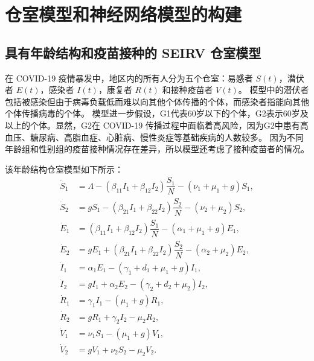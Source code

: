\chapter{仓室模型和神经网络模型的构建} \label{ch:models}


\section{具有年龄结构和疫苗接种的 SEIRV 仓室模型}

在 COVID-19 疫情暴发中，地区内的所有人分为五个仓室：易感者 $ S(t) $，潜伏者 $ E(t) $，感染者 $ I(t) $，康复者 $ R(t) $ 和接种疫苗者 $ V(t) $。
模型中的潜伏者包括被感染但由于病毒负载低而难以向其他个体传播的个体，而感染者指能向其他个体传播病毒的个体。
模型进一步假设，G1代表60岁以下的个体，G2表示60岁及以上的个体。显然，G2在 COVID-19 传播过程中面临着高风险，因为G2中患有高血压、糖尿病、高脂血症、心脏病、慢性炎症等基础疾病的人数较多。
因为不同年龄组和性别组的疫苗接种情况存在差异，所以模型还考虑了接种疫苗者的情况。

该年龄结构仓室模型如下所示：
\begin{equation}
	\label{eq:model}
	\begin{aligned}
		\dot{S}_1 & = \Lambda-(\beta_{11} I_1+\beta_{12} I_2) \dfrac{S_1}{N} -(\nu_1+\mu_1+g) S_1,            \\
		\dot{S}_2 & = g S_1-(\beta_{21} I_1+\beta_{22} I_2) \dfrac{S_2}{N}-\left(\nu_2+\mu_2\right) S_2,      \\
		\dot{E}_1 & = (\beta_{11} I_1+\beta_{12} I_2) \dfrac{S_1}{N}-\left(\alpha_1+\mu_1+g\right) E_1,     \\
		\dot{E}_2 & = g E_1+(\beta_{21} I_1+\beta_{22} I_2) \dfrac{S_2}{N}-\left(\alpha_2+\mu_2\right) E_2, \\
		\dot{I}_1 & = \alpha_1 E_1-\left(\gamma_1+d_1+\mu_1+g\right) I_1,                                  \\
		\dot{I}_2 & = gI_1+\alpha_2 E_2-\left(\gamma_2+d_2+\mu_2\right) I_2,                               \\
		\dot{R}_1 & = \gamma_1 I_1-\left(\mu_1+g\right) R_1,                                               \\
		\dot{R}_2 & = g R_1+\gamma_2 I_2-\mu_2 R_2,                                                        \\
		\dot{V}_1 & = \nu_1 S_1-\left(\mu_1+g\right) V_1,                                                  \\
		\dot{V}_2 & = g V_1+\nu_2 S_2-\mu_2 V_2 \text{.}
	\end{aligned}
\end{equation}

